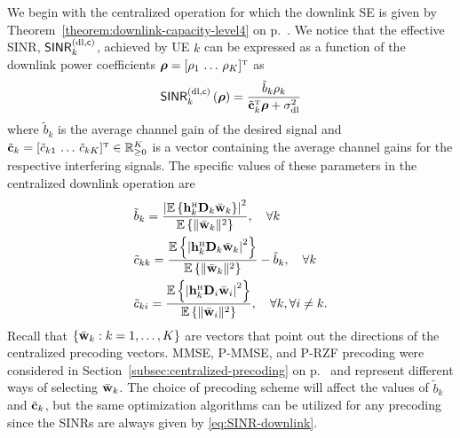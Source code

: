 We begin with the centralized operation for which the downlink SE is given by Theorem~\ref{theorem:downlink-capacity-level4} on p.~\pageref{theorem:downlink-capacity-level4}. We notice that the effective SINR, $\mathsf{SINR}_{k}^{({\rm dl},\mathsf{c})}$, achieved by UE $k$ can be expressed as a function of the downlink power coefficients $\boldsymbol{\rho}=[\rho_1 \, \ldots \, \rho_K]^{\Ttran}$ as
\begin{align}\label{eq:SINR-downlink}
\mathacr{SINR}_{k}^{({\rm dl},\cent)}\left(\boldsymbol{\rho}\right)=\frac{\tilde{b}_k\rho_k}{\tilde{\vect{c}}_k^{\Ttran}\boldsymbol{\rho}+\sigmaDL}
\end{align}
where $\tilde{b}_k$ is the average channel gain of the desired signal and $\tilde{\vect{c}}_k=[\tilde{c}_{k1} \, \ldots \, \tilde{c}_{kK}]^{\Ttran}\in \mathbb{R}_{\geq 0}^K$ is a vector containing the average channel gains for the respective interfering signals.
The specific values of these parameters in the centralized downlink operation are
\begin{align}
&\tilde{b}_k=  \frac{\left| \mathbb{E} \left\{ \vect{h}_{k}^{\Htran}\vect{D}_{k}\bar{\vect{w}}_{k}\right\} \right|^2 }{ \mathbb{E} \left\{ \| \bar{\vect{w}}_k \|^2 \right\}}, \quad \forall k \\
&\tilde{c}_{kk}= \frac{ \mathbb{E} \left\{\left|  \vect{h}_{k}^{\Htran}\vect{D}_{k}\bar{\vect{w}}_{k}\right|^2\right\} }{ \mathbb{E} \left\{ \| \bar{\vect{w}}_k \|^2 \right\}} -\tilde{b}_k, \quad \forall k\\
&\tilde{c}_{ki}= \frac{ \mathbb{E} \left\{\left|  \vect{h}_{k}^{\Htran}\vect{D}_{i}\bar{\vect{w}}_{i}\right|^2\right\} }{ \mathbb{E} \left\{ \| \bar{\vect{w}}_i \|^2 \right\} },  \quad \forall k, \forall i\neq k .
\end{align}
Recall that $\{\bar{\mathbf{w}}_{k}: k=1,\ldots,K\}$ are vectors that point out the directions of the centralized precoding vectors. MMSE, P-MMSE, and P-RZF precoding were considered in Section~\ref{subsec:centralized-precoding} on p.~\pageref{subsec:centralized-precoding} and represent different ways of selecting $\bar{\mathbf{w}}_{k}$. The choice of precoding scheme will affect the values of $\tilde{b}_k$ and $\tilde{\mathbf{c}}_k$, but the same optimization algorithms can be utilized for any precoding since the SINRs are always given by \eqref{eq:SINR-downlink}.

